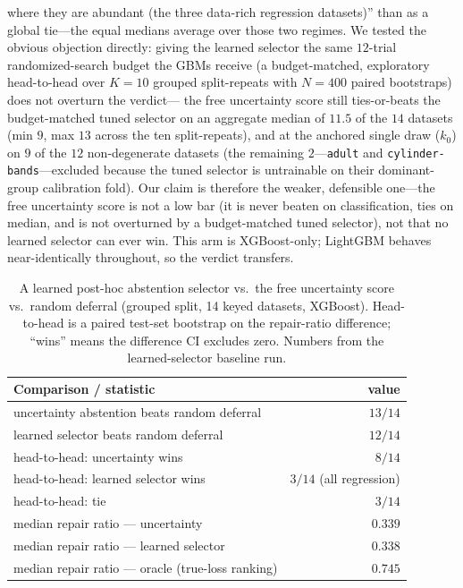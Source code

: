 \documentclass[11pt]{article}
\begin{document}
where they are abundant (the three data-rich regression datasets)'' than as a global tie---the equal medians
average over those two regimes. We tested the obvious objection directly: giving the learned selector the
same $12$-trial randomized-search budget the GBMs receive (a budget-matched, exploratory head-to-head
over $K{=}10$ grouped split-repeats with $N{=}400$ paired bootstraps) does not overturn the verdict---
the free uncertainty score still ties-or-beats the budget-matched tuned selector on an aggregate median of
$11.5$ of the $14$ datasets (min $9$, max $13$ across the ten split-repeats), and at the anchored single draw
($k_0$) on $9$ of the $12$ non-degenerate datasets (the remaining $2$---\texttt{adult} and
\texttt{cylinder-bands}---excluded because the tuned selector is untrainable on their dominant-group
calibration fold). Our claim is therefore the weaker, defensible one---the free uncertainty score is not
a low bar (it is never beaten on classification, ties on median, and is not overturned by a budget-matched
tuned selector), not that no learned selector can ever win. This arm is
XGBoost-only; LightGBM behaves near-identically throughout, so the verdict transfers.

\begin{table}[h]\centering\small
\caption{A learned post-hoc abstention selector vs.\ the free uncertainty score vs.\ random deferral (grouped
split, 14 keyed datasets, XGBoost). Head-to-head is a paired test-set bootstrap on the repair-ratio difference;
``wins'' means the difference CI excludes zero. Numbers from the learned-selector baseline run.}\label{tab:learned}
\begin{tabular}{lr}
\toprule
Comparison / statistic & value \\
\midrule
uncertainty abstention beats random deferral      & $13/14$ \\
learned selector beats random deferral            & $12/14$ \\
head-to-head: uncertainty wins                     & $8/14$ \\
head-to-head: learned selector wins                & $3/14$ (all regression) \\
head-to-head: tie                                  & $3/14$ \\
median repair ratio --- uncertainty                & $0.339$ \\
median repair ratio --- learned selector           & $0.338$ \\
median repair ratio --- oracle (true-loss ranking) & $0.745$ \\
\bottomrule
\end{tabular}
\end{table}
\end{document}
